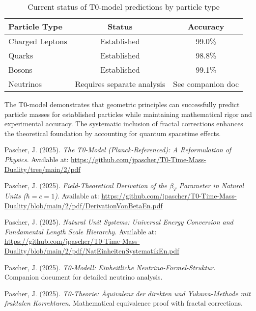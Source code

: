 \documentclass[12pt,a4paper]{article}
\begin{document}
	\begin{table}[H]
		\centering
		\begin{tabular}{lcc}
			\toprule
			\textbf{Particle Type} & \textbf{Status} & \textbf{Accuracy} \\
			\midrule
			Charged Leptons & Established & 99.0\% \\
			Quarks & Established & 98.8\% \\
			Bosons & Established & 99.1\% \\
			Neutrinos & Requires separate analysis & See companion doc \\
			\bottomrule
		\end{tabular}
		\caption{Current status of T0-model predictions by particle type}
		\label{tab:status_summary}
	\end{table}
	
	The T0-model demonstrates that geometric principles can successfully predict particle masses for established particles while maintaining mathematical rigor and experimental accuracy. The systematic inclusion of fractal corrections enhances the theoretical foundation by accounting for quantum spacetime effects.
	
	\newpage
	\begin{thebibliography}{99}
		Pascher, J. (2025). \textit{The T0-Model (Planck-Referenced): A Reformulation of Physics}. Available at: \url{https://github.com/jpascher/T0-Time-Mass-Duality/tree/main/2/pdf}
		
		Pascher, J. (2025). \textit{Field-Theoretical Derivation of the $\beta_T$ Parameter in Natural Units ($\hbar = c = 1$)}. Available at: \url{https://github.com/jpascher/T0-Time-Mass-Duality/blob/main/2/pdf/DerivationVonBetaEn.pdf}
		
		Pascher, J. (2025). \textit{Natural Unit Systems: Universal Energy Conversion and Fundamental Length Scale Hierarchy}. Available at: \url{https://github.com/jpascher/T0-Time-Mass-Duality/blob/main/2/pdf/NatEinheitenSystematikEn.pdf}
		
		Pascher, J. (2025). \textit{T0-Modell: Einheitliche Neutrino-Formel-Struktur}. Companion document for detailed neutrino analysis.
		
		Pascher, J. (2025). \textit{T0-Theorie: Äquivalenz der direkten und Yukawa-Methode mit fraktalen Korrekturen}. Mathematical equivalence proof with fractal corrections.
		
	\end{thebibliography}
	
\end{document}
